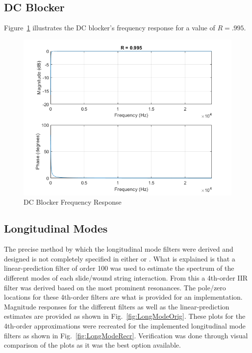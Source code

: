 \documentclass[../main.tex]{subfiles}
\begin{document}
\subsection{DC Blocker}
Figure~\ref{fig:DCBlockerResponse} illustrates the DC blocker's frequency response for a value of $R = .995$.

\begin{figure}[h]
    \centering
    \includegraphics[scale=.65]{./images/plots/DCBlockerResponse.png}
    \caption{DC Blocker Frequency Response}
    \label{fig:DCBlockerResponse}
\end{figure}

\clearpage

\subsection{Longitudinal Modes}
The precise method by which the longitudinal mode filters were derived and designed is not completely specified in either  or . What is explained is that a linear-prediction filter of order 100 was used to estimate the spectrum of the different modes of each slide/wound string interaction. From this a 4th-order IIR filter was derived based on the most prominent resonances. The pole/zero locations for these 4th-order filters are what is provided for an implementation. Magnitude responses for the different filters as well as the linear-prediction estimates are provided as shown in Fig.~\ref{fig:LongModeOrig}. These plots for the 4th-order approximations were recreated for the implemented longitudinal mode filters as shown in Fig.~\ref{fig:LongModeRecr}. Verification was done through visual comparison of the plots as it was the best option available.
\end{document}
